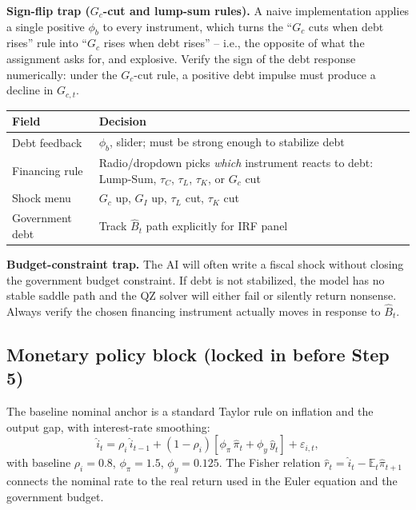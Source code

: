 \documentclass[11pt]{article}
\begin{document}
\begin{warningbox}
\textbf{Sign-flip trap ($G_c$-cut and lump-sum rules).} A naive implementation applies a single positive $\phi_b$ to every instrument, which turns the ``$G_c$ cuts when debt rises'' rule into ``$G_c$ rises when debt rises'' -- i.e., the opposite of what the assignment asks for, and explosive. Verify the sign of the debt response numerically: under the $G_c$-cut rule, a positive debt impulse must produce a decline in $G_{c,t}$.
\end{warningbox}

\begin{tabularx}{\linewidth}{@{}p{3.1cm}X@{}}
\toprule
\textbf{Field} & \textbf{Decision} \\
\midrule
Debt feedback & $\phi_b$, slider; must be strong enough to stabilize debt \\
Financing rule & Radio/dropdown picks \textit{which} instrument reacts to debt: Lump-Sum, $\tau_C$, $\tau_L$, $\tau_K$, or $G_c$ cut \\
Shock menu & $G_c$ up, $G_I$ up, $\tau_L$ cut, $\tau_K$ cut \\
Government debt & Track $\hat{B}_t$ path explicitly for IRF panel \\
\bottomrule
\end{tabularx}

\begin{warningbox}
\textbf{Budget-constraint trap.} The AI will often write a fiscal shock without closing the government budget constraint. If debt is not stabilized, the model has no stable saddle path and the QZ solver will either fail or silently return nonsense. Always verify the chosen financing instrument actually moves in response to $\hat{B}_t$.
\end{warningbox}

\subsection{Monetary policy block (locked in before Step 5)}
The baseline nominal anchor is a standard Taylor rule on inflation and the output gap, with interest-rate smoothing:
\[
\hat{i}_t = \rho_i\,\hat{i}_{t-1} + (1-\rho_i)\left[\phi_\pi\, \hat{\pi}_t + \phi_y\, \hat{y}_t\right] + \varepsilon_{i,t},
\]
with baseline $\rho_i = 0.8$, $\phi_\pi = 1.5$, $\phi_y = 0.125$. The Fisher relation $\hat{r}_t = \hat{i}_t - \mathbb{E}_t \hat{\pi}_{t+1}$ connects the nominal rate to the real return used in the Euler equation and the government budget.
\end{document}

